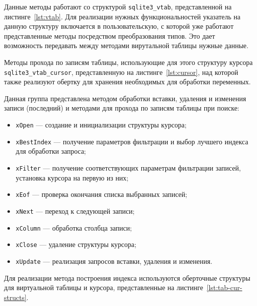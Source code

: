 
Данные методы работают со структурой \texttt{sqlite3\_vtab}, представленной на
листинге~\ref{lst:vtab}. Для реализации нужных функциональностей указатель на
данную структуру включается в пользовательскую, с которой уже работают
представленные методы посредством преобразования типов. Это дает возможность
передавать между методами вирутальной таблицы нужные данные.


Методы прохода по записям таблицы, использующие для этого структуру курсора
\texttt{sqlite3\_vtab\_cursor}, представленную на листинге~\ref{lst:cursor}, над
которой также реализуют обертку для хранения необходимых для обработки
переменных.


Данная группа представлена методом обработки вставки, удаления и
изменения записи (последний) и методами для прохода по записям таблицы
при поиске:
\begin{itemize}
    \item \texttt{xOpen} --- создание и инициализации структуры курсора;
    \item \texttt{xBestIndex} --- получение параметров фильтрации и
        выбор лучшего индекса для обработки запроса;
    \item \texttt{xFilter} --- получение соответствующих параметрам
        фильтрации записей, установка курсора на первую из них;
    \item \texttt{xEof} --- проверка окончания списка выбранных записей;
    \item \texttt{xNext} --- переход к следующей записи;
    \item \texttt{xColumn} --- обработка столбца записи;
    \item \texttt{xClose} --- удаление структуры курсора;
    \item \texttt{xUpdate} --- реализация запросов вставки, удаления и
        изменения.
\end{itemize}

Для реализации метода построения индекса используются оберточные структуры для
виртуальной таблицы и курсора, представленные на
листинге~\ref{lst:tab-cur-structs}.



